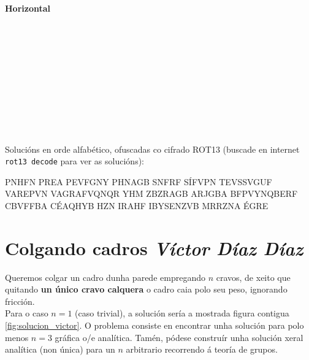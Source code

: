 \begin{refsection}
\begin{multicols}{2}
\begin{PuzzleClues}{\textbf{Horizontal}}\\
\\
\\
\\
\\
\\
\\
\\
\\
\\
\\
\end{PuzzleClues}
\end{multicols}


\begin{center}
Solucións en orde alfabético, ofuscadas co cifrado ROT13 (buscade en internet \texttt{rot13 decode} para ver as solucións):

\vspace*{1em}

PNHFN PREA PEVFGNY PHNAGB SNFRF SÍFVPN TEVSSVGUF VAREPVN VAGRAFVQNQR YHM
ZBZRAGB ARJGBA BFPVYNQBERF CBVFFBA CÉAQHYB HZN IRAHF IBYSENZVB MRRZNA ÉGRE
\end{center}

\newpage
\section*{\textcolor{Resalte}{Colgando cadros} {\normalfont \itshape Víctor Díaz Díaz}}%

\begin{multicols}{2}

Queremos colgar un cadro dunha parede empregando $n$ cravos, de xeito que
quitando \textbf{un único cravo calquera} o cadro caia polo seu peso, ignorando
fricción.\\
Para o caso $n=1$ (caso trivial), a solución sería a mostrada figura contigua \ref{fig:solucion_victor}. O problema consiste en encontrar unha solución para polo menos $n=3$ gráfica o/e analítica. Tamén, pódese construír unha solución xeral analítica (non única) para un $n$ arbitrario recorrendo á teoría de grupos.


\end{multicols}
\end{refsection}
